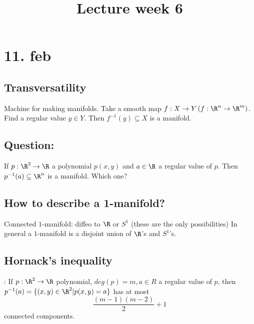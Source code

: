 \title{Lecture week 6}
\maketitle
\section{11. feb}
\subsection*{Transversatility}
Machine for making manifolds.
\newline Take a smooth map $f: X \to Y \left(f:\R^n \to \R^m\right)$.
\newline Find a regular value $y\in Y$. Then $f ^{-1}(y) \subseteq X $ is a manifold.

\subsection*{Question:}
If $p: \R^2 \to \R$ a polynomial $p(x,y)$ and $a\in \R$ a regular value of $p$. Then $p ^{-1}(a) \subseteq \R^n $ is a manifold. Which one?

\subsection*{How to describe a 1-manifold?}
Connected $1$-manifold: diffeo to $\R$ or $S^1$ (these are the only possibilities)
\newline In general a $1$-manifold is a disjoint union of $\R$'s and $S^1$'s.

\subsection*{Hornack's inequality}:
If $p: \R^2 \to \R$ polynomial, $deg(p)=m, a\in R$ a regular value of $p$, then $p ^{-1}(a)=\{(x,y)\in \R^2 | p(x,y)=a\}$ has at most
  $$\frac{(m-1)(m-2)}{2}+1$$
connected components.

